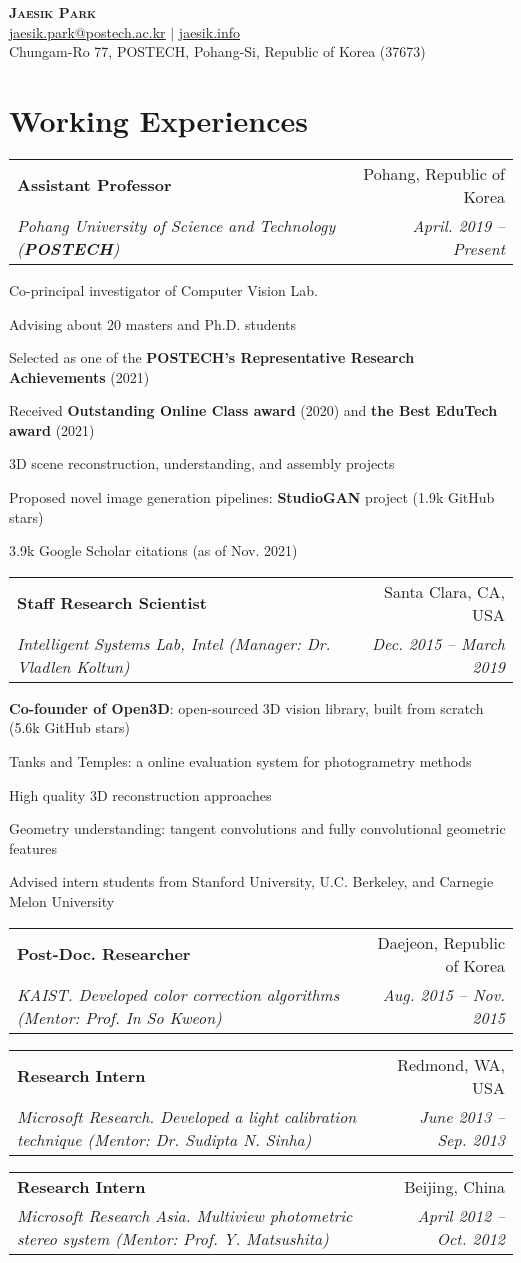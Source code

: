 \documentclass[letterpaper,11pt]{article}
\makeatletter
\newcommand{\resumeItem}[1]{
  \small{
  \item{#1 \vspace{-2pt}}
  }
}
\newcommand{\resumeSubheading}[4]{
  \vspace{-2pt}\item
    \begin{tabular*}{0.97\textwidth}[t]{l@{\extracolsep{\fill}}r}
      \textbf{#1} & #2 \\
      \textit{\small#3} & \textit{\small #4} \\
    \end{tabular*}\vspace{-7pt}
}
\newcommand{\resumeSubHeadingListStart}{\begin{itemize}[leftmargin=0.15in, label={}]}
\newcommand{\resumeSubHeadingListEnd}{\end{itemize}}
\newcommand{\resumeItemListStart}{\begin{itemize}}
\newcommand{\resumeItemListEnd}{\end{itemize}\vspace{-5pt}}
\makeatother
\begin{document}
\begin{center}
    \textbf{\Huge \scshape Jaesik Park} \\ \vspace{3pt}
    \small \href{mailto:jaesik.park@postech.ac.kr}{\underline{jaesik.park@postech.ac.kr}} $|$ 
    \href{http://jaesik.info}{\underline{jaesik.info}}\\
    \footnotesize{Chungam-Ro 77, POSTECH, Pohang-Si, Republic of Korea (37673)}
\end{center}

\section{Working Experiences}
  \resumeSubHeadingListStart
    \resumeSubheading
      {Assistant Professor}{Pohang, Republic of Korea}
      {Pohang University of Science and Technology \textnormal{(\textbf{POSTECH})}}{April. 2019 -- Present}
        \resumeItemListStart
          \resumeItem{Co-principal investigator of Computer Vision Lab.}
          \resumeItem{Advising about 20 masters and Ph.D. students}
          \resumeItem{Selected as one of the \textbf{POSTECH's Representative Research Achievements} (2021)}
          \resumeItem{Received \textbf{Outstanding Online Class award} (2020) and \textbf{the Best EduTech award} (2021)}
          \resumeItem{3D scene reconstruction, understanding, and assembly projects}
          \resumeItem{Proposed novel image generation pipelines: \textbf{StudioGAN} project (1.9k GitHub stars)}
          \resumeItem{3.9k Google Scholar citations (as of Nov. 2021)}
        \resumeItemListEnd
    \resumeSubheading
      {Staff Research Scientist}{Santa Clara, CA, USA}
      {Intelligent Systems Lab, Intel (Manager: Dr. Vladlen Koltun)}{Dec. 2015 -- March 2019}
        \resumeItemListStart
          \resumeItem{\textbf{Co-founder of Open3D}: open-sourced 3D vision library, built from scratch (5.6k GitHub stars)}
          \resumeItem{Tanks and Temples: a online evaluation system for photogrametry methods}
          \resumeItem{High quality 3D reconstruction approaches}
          \resumeItem{Geometry understanding: tangent convolutions and fully convolutional geometric features}
          \resumeItem{Advised intern students from Stanford University, U.C. Berkeley, and Carnegie Melon University}
        \resumeItemListEnd
    \resumeSubheading
      {Post-Doc. Researcher}{Daejeon, Republic of Korea}
      {KAIST. Developed color correction algorithms (Mentor: Prof. In So Kweon)}{Aug. 2015 -- Nov. 2015}
    \resumeSubheading
      {Research Intern}{Redmond, WA, USA}
      {Microsoft Research. Developed a light calibration technique (Mentor: Dr. Sudipta N. Sinha)}{June 2013 -- Sep. 2013}
    \resumeSubheading
      {Research Intern}{Beijing, China}
      {Microsoft Research Asia. Multiview photometric stereo system (Mentor: Prof. Y. Matsushita)}{April 2012 -- Oct. 2012}     
  \resumeSubHeadingListEnd
\end{document}
